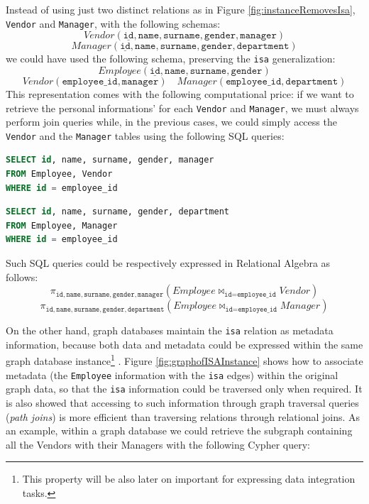 \begin{example}
Instead of using just two distinct relations as in Figure \ref{fig:instanceRemovesIsa}, \texttt{Vendor} and \texttt{Manager}, with the following schemas:
\[Vendor(\underline{\texttt{id}},\texttt{name},\texttt{surname},\texttt{gender},\texttt{manager})\]
\[Manager(\underline{\texttt{id}},\texttt{name},\texttt{surname},\texttt{gender},\texttt{department})\]
we could have used the following schema, preserving the \texttt{isa} generalization:
\[Employee(\underline{\texttt{id}},\texttt{name},\texttt{surname},\texttt{gender})\]
\[Vendor({\texttt{employee\_id}},\texttt{manager})\quad Manager({\texttt{employee\_id}},\texttt{department})\]
This representation comes with the following computational price: if we want to retrieve the personal informations' for each \texttt{Vendor} and \texttt{Manager}, we must always perform join queries while, in the previous cases, we could simply access the \texttt{Vendor} and the \texttt{Manager} tables using the following SQL queries:
\begin{lstlisting}[language=SQL,mathescape=true]
SELECT id, name, surname, gender, manager
FROM Employee, Vendor
WHERE id = employee_id
\end{lstlisting}

\begin{lstlisting}[language=SQL,mathescape=true]
SELECT id, name, surname, gender, department
FROM Employee, Manager
WHERE id = employee_id
\end{lstlisting}

Such SQL queries could be respectively expressed in Relational Algebra as follows:
\[\pi_{\texttt{id},\texttt{name},\texttt{surname},\texttt{gender},\texttt{manager}}(Employee\Join_{\texttt{id}=\texttt{employee\_id}}Vendor)\]
\[\pi_{\texttt{id},\texttt{name},\texttt{surname},\texttt{gender},\texttt{department}}(Employee\Join_{\texttt{id}=\texttt{employee\_id}}Manager)\]

\end{example}

On the other hand, graph databases maintain the \texttt{isa} relation as metadata \cite{Lassila1999} information, because both data and metadata could be expressed within the same graph database instance\footnote{This property will be also later on important for expressing data integration tasks.} \cite{Vasilyeva13}. Figure \ref{fig:graphofISAInstance} shows how to associate metadata (the \texttt{Employee} information with the \texttt{isa} edges) within the original graph data, so that the \texttt{isa} information could be traversed only when required. It is also showed that accessing to such information through graph traversal queries (\textit{path joins}) is more efficient than traversing relations through relational joins. As an example, within a graph database we could retrieve the subgraph containing all the Vendors with their Managers with the following Cypher query:

